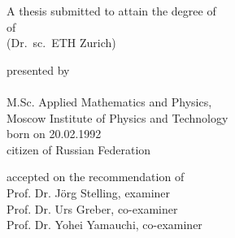 \begin{titlepage}
    \begin{center}
        \large
        \begingroup
        \endgroup

        \hfill

        \vfill

        \begingroup
            \spacedallcaps{\myTitle}
        \endgroup

        \vfill

        \begingroup
            A thesis submitted to attain the degree of\\
            \vspace{0.5em}
            of
             \\
            (Dr.\ sc.\ ETH Zurich)
        \endgroup

        \vfill

        \begingroup
            presented by\\
            \vspace{0.5em}
            \spacedlowsmallcaps{\myName}\\
            M.Sc. Applied Mathematics and Physics,\\
Moscow Institute of Physics and Technology \\
            \vspace{0.5em}
            born on 20.02.1992\\
            citizen of Russian Federation
        \endgroup

        \vfill

        \begingroup
            accepted on the recommendation of\\
            \vspace{0.5em}
            Prof. Dr. Jörg Stelling, examiner\\
            Prof. Dr. Urs Greber, co-examiner\\
            Prof. Dr. Yohei Yamauchi, co-examiner\\
        \endgroup

        \vfill

        \myTime%

        \vfill
    \end{center}
\end{titlepage}
